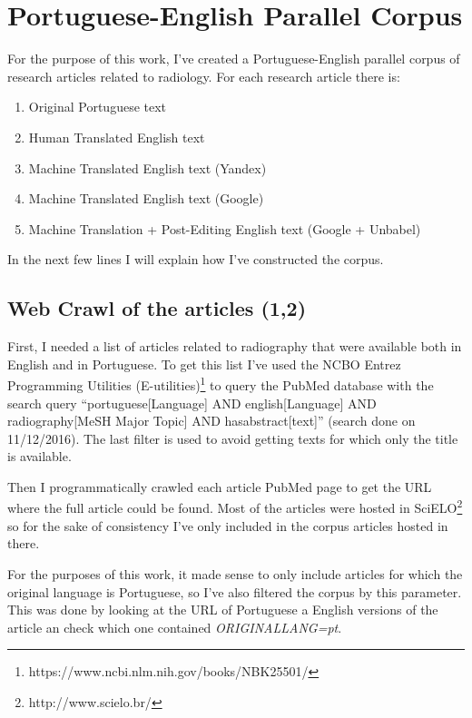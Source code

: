 \label{chap3}

\section{Portuguese-English Parallel Corpus}

For the purpose of this work, I've created a Portuguese-English parallel corpus of research articles related to radiology. For each research article there is:

\begin{enumerate}
\item Original Portuguese text
\item Human Translated English text
\item Machine Translated English text (Yandex) 
\item Machine Translated English text (Google) 
\item Machine Translation + Post-Editing English text (Google + Unbabel) 
\end{enumerate}

In the next few lines I will explain how I've constructed the corpus. 

\subsection{Web Crawl of the articles (1,2)}

First, I needed a list of articles related to radiography that were available both in English and in Portuguese. To get this list I’ve used the  NCBO Entrez Programming Utilities (E-utilities)\footnote{https://www.ncbi.nlm.nih.gov/books/NBK25501/} to query the PubMed database with the search query “portuguese[Language] AND english[Language] AND radiography[MeSH Major Topic] AND hasabstract[text]” (search done on 11/12/2016). The last filter is used to avoid getting texts for which only the title is available. 

Then I programmatically crawled each article PubMed page to get the URL where the full article could be found. Most of the articles were hosted in SciELO\footnote{http://www.scielo.br/} so for the sake of consistency I've only included in the corpus articles hosted in there. 

For the purposes of this work, it made sense to only include articles for which the original language is Portuguese, so I've also filtered the corpus by this parameter. This was done by looking at the URL of Portuguese a English versions of the article an check which one contained \textit{ORIGINALLANG=pt}. 


